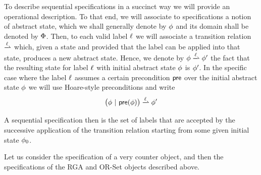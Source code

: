 To describe sequential specifications in a succinct way we will
provide an operational description.
To that end, we will associate to specifications a notion of abstract
state, which we shall generally denote by $\phi$ and its domain
shall be denoted by $\Phi$.
Then, to each valid label $\ell$ we will associate a transition
relation \;$\xrightharpoonup{\alabel}$\; which, given a state and provided
that the label can be applied into that state, produces a new abstract
state.
Hence, we denote by $\abstate \xrightharpoonup{\alabel}  \abstate'$
the fact that the resulting state for label $\ell$ with initial
abstract state $\phi$ is $\phi'$.
%
In the specific case where the label $\ell$ assumes a certain
precondition $\mathsf{pre}$ over the initial abstract state $\phi$ we
will use Hoare-style preconditions and write
\[ \big(\abstate\ |\ \apre(\abstate)\big) \xrightharpoonup{\alabel}  \abstate' \]

A sequential specification then is the set of labels that are accepted
by the successive application of the transition relation starting from
some given initial state $\phi_{0}$.




Let us consider the specification of a very counter object, and then
the specifications of the RGA and OR-Set objects described above.

